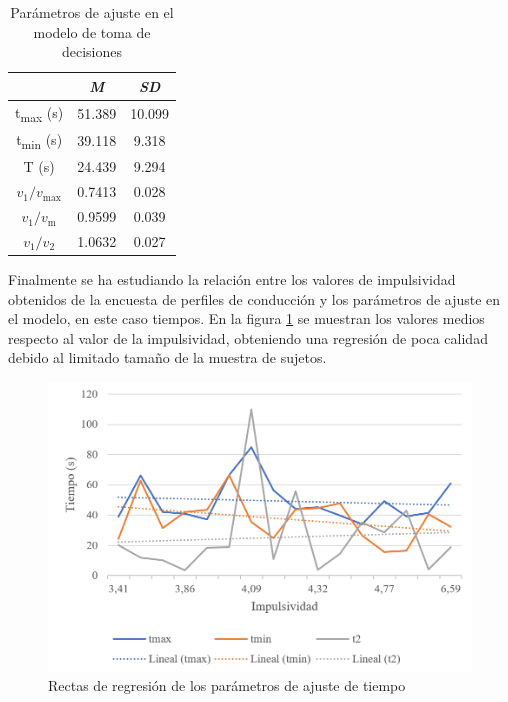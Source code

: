 \newpage
\begin{table}[h]
\centering
\begin{tabular}{@{}cclc@{}}
\textbf{}      & \multicolumn{2}{c}{\textit{M}}      & \textit{SD}      \\ \midrule
t\textsubscript{max} (s)       & \multicolumn{2}{c}{51.389} & 10.099           \\
t\textsubscript{min} (s)       & \multicolumn{2}{c}{39.118} & 9.318            \\
T (s)          & \multicolumn{2}{c}{24.439} & 9.294            \\
$v_1/v_{\text{max}}$      & \multicolumn{2}{c}{0.7413} & 0.028            \\
$v_1/v_{\text{m}}$        & \multicolumn{2}{c}{0.9599} & 0.039            \\
$v_1/v_2$        & \multicolumn{2}{c}{1.0632} & 0.027   \\ \bottomrule        
\end{tabular}
\caption{Parámetros de ajuste en el modelo de toma de decisiones}
\label{tab:5.9}
\end{table}

Finalmente se ha estudiando la relación entre los valores de impulsividad obtenidos de la encuesta de perfiles de conducción y los parámetros de ajuste en el modelo, en este caso tiempos. En la figura \ref{fig:5.10} se muestran los valores medios respecto al valor de la impulsividad, obteniendo una regresión de poca calidad debido al limitado tamaño de la muestra de sujetos.

\begin{figure}[h]
    \centering
    \includegraphics[width=12cm]
    {figures/5.10.png}
    \caption{ \label{fig:5.10} Rectas de regresión de los parámetros de ajuste de tiempo}
\end{figure}

